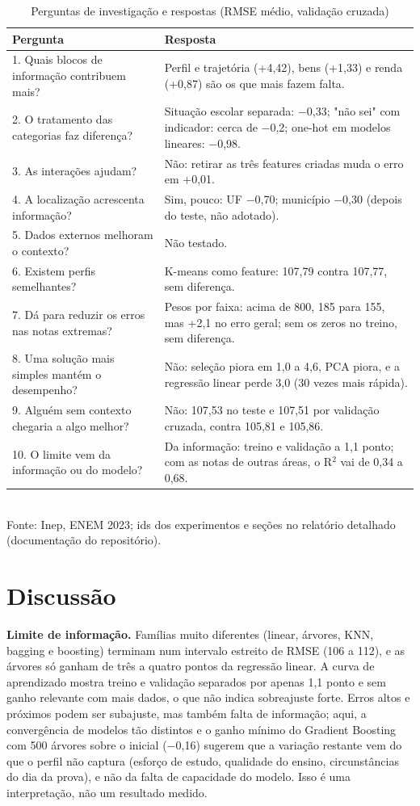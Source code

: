 \documentclass[conference,a4paper]{IEEEtran}
\begin{document}
\begin{table}[!t]
\caption{Perguntas de investigação e respostas (RMSE médio, validação cruzada)}
\centering\footnotesize
\begin{tabularx}{\textwidth}{l>{\raggedright\arraybackslash}X}
\toprule
\textbf{Pergunta} & \textbf{Resposta} \\
\midrule
1. Quais blocos de informação contribuem mais? & Perfil e trajetória (+4,42), bens (+1,33) e renda (+0,87) são os que mais fazem falta. \\
2. O tratamento das categorias faz diferença? & Situação escolar separada: $-$0,33; "não sei" com indicador: cerca de $-$0,2; one-hot em modelos lineares: $-$0,98. \\
3. As interações ajudam? & Não: retirar as três features criadas muda o erro em +0,01. \\
4. A localização acrescenta informação? & Sim, pouco: UF $-$0,70; município $-$0,30 (depois do teste, não adotado). \\
5. Dados externos melhoram o contexto? & Não testado. \\
6. Existem perfis semelhantes? & K-means como feature: 107,79 contra 107,77, sem diferença. \\
7. Dá para reduzir os erros nas notas extremas? & Pesos por faixa: acima de 800, 185 para 155, mas +2,1 no erro geral; sem os zeros no treino, sem diferença. \\
8. Uma solução mais simples mantém o desempenho? & Não: seleção piora em 1,0 a 4,6, PCA piora, e a regressão linear perde 3,0 (30 vezes mais rápida). \\
9. Alguém sem contexto chegaria a algo melhor? & Não: 107,53 no teste e 107,51 por validação cruzada, contra 105,81 e 105,86. \\
10. O limite vem da informação ou do modelo? & Da informação: treino e validação a 1,1 ponto; com as notas de outras áreas, o R$^2$ vai de 0,34 a 0,68. \\
\bottomrule
\end{tabularx}
\\[2pt]{\scriptsize Fonte: Inep, ENEM 2023; ids dos experimentos e seções no relatório detalhado (documentação do repositório).}
\end{table}


\section{Discussão}
\textbf{Limite de informação.} Famílias muito diferentes (linear, árvores, KNN, bagging e boosting) terminam num intervalo estreito de RMSE (106 a 112), e as árvores só ganham de três a quatro pontos da regressão linear. A curva de aprendizado mostra treino e validação separados por apenas 1,1 ponto e sem ganho relevante com mais dados, o que não indica sobreajuste forte. Erros altos e próximos podem ser subajuste, mas também falta de informação; aqui, a convergência de modelos tão distintos e o ganho mínimo do Gradient Boosting com 500 árvores sobre o inicial ($-$0,16) sugerem que a variação restante vem do que o perfil não captura (esforço de estudo, qualidade do ensino, circunstâncias do dia da prova), e não da falta de capacidade do modelo. Isso é uma interpretação, não um resultado medido.
\end{document}
